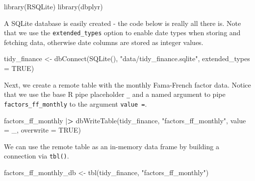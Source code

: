 \documentclass[
]{book}
\newenvironment{Shaded}{\begin{snugshade}}{\end{snugshade}}
\newcommand{\AttributeTok}[1]{\textcolor[rgb]{0.61,0.61,0.61}{#1}}
\newcommand{\ConstantTok}[1]{\textcolor[rgb]{0,0,0}{#1}}
\newcommand{\ErrorTok}[1]{\textcolor[rgb]{0.14,0.14,0.14}{\textbf{#1}}}
\newcommand{\FunctionTok}[1]{\textcolor[rgb]{0,0,0}{#1}}
\newcommand{\NormalTok}[1]{#1}
\newcommand{\OtherTok}[1]{\textcolor[rgb]{0.37,0.37,0.37}{#1}}
\newcommand{\SpecialCharTok}[1]{\textcolor[rgb]{0,0,0}{#1}}
\newcommand{\StringTok}[1]{\textcolor[rgb]{0.5,0.5,0.5}{#1}}
\begin{document}
\begin{Shaded}
\begin{Highlighting}[]
\FunctionTok{library}\NormalTok{(RSQLite)}
\FunctionTok{library}\NormalTok{(dbplyr)}
\end{Highlighting}
\end{Shaded}

A SQLite database is easily created - the code below is really all there is. Note that we use the \texttt{extended\_types} option to enable date types when storing and fetching data, otherwise date columns are stored as integer values.

\begin{Shaded}
\begin{Highlighting}[]
\NormalTok{tidy\_finance }\OtherTok{\textless{}{-}} \FunctionTok{dbConnect}\NormalTok{(}\FunctionTok{SQLite}\NormalTok{(), }
                          \StringTok{"data/tidy\_finance.sqlite"}\NormalTok{, }
                          \AttributeTok{extended\_types =} \ConstantTok{TRUE}\NormalTok{)}
\end{Highlighting}
\end{Shaded}

Next, we create a remote table with the monthly Fama-French factor data. Notice that we use the base R pipe placeholder \texttt{\_} and a named argument to pipe \texttt{factors\_ff\_monthly} to the argument \texttt{value\ =}.

\begin{Shaded}
\begin{Highlighting}[]
\NormalTok{factors\_ff\_monthly }\SpecialCharTok{|}\ErrorTok{\textgreater{}}
  \FunctionTok{dbWriteTable}\NormalTok{(tidy\_finance, }
               \StringTok{"factors\_ff\_monthly"}\NormalTok{, }
               \AttributeTok{value =}\NormalTok{ \_, }
               \AttributeTok{overwrite =} \ConstantTok{TRUE}\NormalTok{)}
\end{Highlighting}
\end{Shaded}

We can use the remote table as an in-memory data frame by building a connection via \texttt{tbl()}.

\begin{Shaded}
\begin{Highlighting}[]
\NormalTok{factors\_ff\_monthly\_db }\OtherTok{\textless{}{-}} \FunctionTok{tbl}\NormalTok{(tidy\_finance, }
                             \StringTok{"factors\_ff\_monthly"}\NormalTok{)}
\end{Highlighting}
\end{Shaded}
\end{document}
